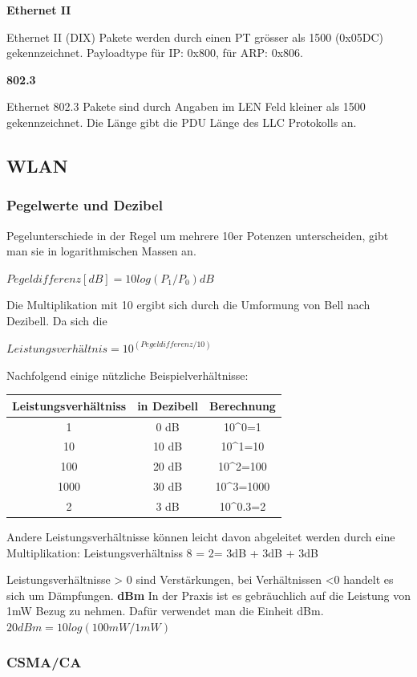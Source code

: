 \textbf{Ethernet II}

Ethernet II (DIX) Pakete werden durch einen PT grösser als 1500
(0x05DC) gekennzeichnet. Payloadtype für IP: 0x800, für ARP: 0x806.

\textbf{802.3}

Ethernet 802.3 Pakete sind durch Angaben im LEN Feld kleiner als 1500
gekennzeichnet. Die Länge gibt die PDU Länge des LLC Protokolls an.


\subsection{WLAN}

\subsubsection{Pegelwerte und Dezibel}
Pegelunterschiede in der Regel um mehrere 10er Potenzen unterscheiden, gibt man sie in logarithmischen Massen an.

$Pegeldifferenz [dB] = 10log(P_1/P_0) dB$

Die Multiplikation mit 10 ergibt sich durch die Umformung von Bell nach Dezibell. Da sich die 

$Leistungsverhältnis = 10^(Pegeldifferenz/10)$

Nachfolgend einige nützliche Beispielverhältnisse:
\begin{tabular}{|c|c|c|}
\hline 
\textbf{Leistungsverhältniss} & \textbf{in Dezibell} & \textbf{Berechnung} \\ 
\hline 
1 & 0 dB & 10^0=1 \\ 
\hline 
10 & 10 dB & 10^1=10 \\ 
\hline 
100 & 20 dB & 10^2=100 \\ 
\hline 
1000 & 30 dB & 10^3=1000 \\ 
\hline 
2 & 3 dB & 10^0.3=2 \\ 
\hline 
\end{tabular} 
Andere Leistungsverhältnisse können leicht davon abgeleitet werden durch eine Multiplikation:
Leistungsverhältniss 8 = 2\cdot = 3dB + 3dB + 3dB

Leistungsverhältnisse > 0 sind Verstärkungen, bei Verhältnissen <0 handelt es sich um Dämpfungen.
\textbf{dBm}
In der Praxis ist es gebräuchlich auf die Leistung von 1mW Bezug zu nehmen. Dafür verwendet man die Einheit dBm. 
$20dBm = 10log(100mW/1mW)$



\subsubsection{CSMA/CA}

